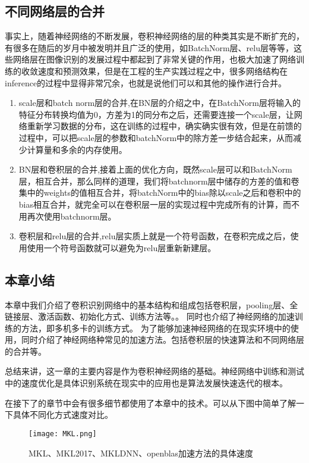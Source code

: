 \subsection{不同网络层的合并}
事实上，随着神经网络的不断发展，卷积神经网络的层的种类其实是不断扩充的，有很多在随后的岁月中被发明并且广泛的使用，如BatchNorm层、relu层等等，这些网络层在图像识别的发展过程中都起到了非常关键的作用，也极大加速了网络训练的收敛速度和预测效果，但是在工程的生产实践过程之中，很多网络结构在inference的过程中显得非常冗余，也就是说他们可以和其他的操作进行合并。
\begin{enumerate}
\item scale层和batch norm层的合并,在BN层的介绍之中，在BatchNorm层将输入的特征分布转换均值为0，方差为1的同分布之后，还需要连接一个scale层，让网络重新学习数据的分布，这在训练的过程中，确实确实很有效，但是在前馈的过程中，可以把scale层的参数和batchNorm中的除方差一步结合起来，从而减少计算量和多余的内存使用。
\item BN层和卷积层的合并,接着上面的优化方向，既然scale层可以和BatchNorm层，相互合并，那么同样的道理，我们将batchnorm层中储存的方差的值和卷集中的weights的值相互合并，将batchNorm中的bias除以scale之后和卷积中的bias相互合并，就完全可以在卷积层一层的实现过程中完成所有的计算，而不用再次使用batchnorm层。
\item 卷积层和relu层的合并,relu层实质上就是一个符号函数，在卷积完成之后，使用使用一个符号函数就可以避免为relu层重新新建层。
\end{enumerate}

\subsection{本章小结}
本章中我们介绍了卷积识别网络中的基本结构和组成包括卷积层，pooling层、全链接层、激活函数、初始化方式、训练方法等。。
同时也介绍了神经网络的加速训练的方法，即多机多卡的训练方式。
为了能够加速神经网络的在现实环境中的使用，同时介绍了神经网络种常见的加速方法。包括卷积层的快速算法和不同网络层的合并等。

总结来讲，这一章的主要内容是作为卷积神经网络的基础。神经网络中训练和测试中的速度优化是具体识别系统在现实中的应用也是算法发展快速迭代的根本。

在接下了的章节中会有很多细节都使用了本章中的技术。可以从下图中简单了解一下具体不同化方式速度对比。
\begin{figure}[!h]
 \centering
	\texttt{[image: MKL.png]}
	\caption{MKL、MKL2017、MKLDNN、openblas加速方法的具体速度}
\end{figure}






